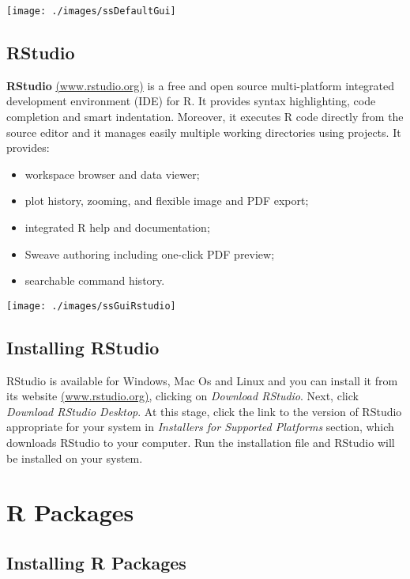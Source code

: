 \documentclass[]{book}
\providecommand{\tightlist}{%
  \setlength{\itemsep}{0pt}\setlength{\parskip}{0pt}}
\def\tightlist{}
\begin{document}
\texttt{[image: ./images/ssDefaultGui]}

\clearpage

\subsection{RStudio}\label{rstudio}

\textbf{RStudio} \href{http://www.rstudio.org/}{(www.rstudio.org)} is a
free and open source multi-platform integrated development environment
(IDE) for R. It provides syntax highlighting, code completion and smart
indentation. Moreover, it executes R code directly from the source
editor and it manages easily multiple working directories using
projects. It provides:

\begin{itemize}
\tightlist
\item
  workspace browser and data viewer;
\item
  plot history, zooming, and flexible image and PDF export;
\item
  integrated R help and documentation;
\item
  Sweave authoring including one-click PDF preview;
\item
  searchable command history.
\end{itemize}

\texttt{[image: ./images/ssGuiRstudio]}

\subsection{Installing RStudio}\label{installing-rstudio}

RStudio is available for Windows, Mac Os and Linux and you can install
it from its website \href{http://www.rstudio.org/}{(www.rstudio.org)},
clicking on \emph{Download RStudio}. Next, click \emph{Download RStudio
Desktop}. At this stage, click the link to the version of RStudio
appropriate for your system in \emph{Installers for Supported Platforms}
section, which downloads RStudio to your computer. Run the installation
file and RStudio will be installed on your system.

\section{R Packages}\label{r-packages}

\subsection{Installing R Packages}\label{installing-r-packages}
\end{document}
